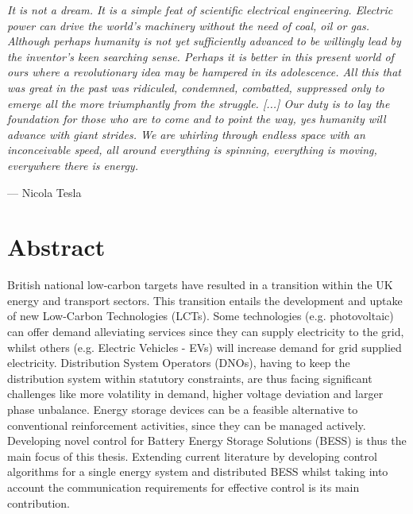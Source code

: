 
\epigraph{\textit{It is not a dream. It is a simple feat of scientific electrical engineering. Electric power can drive the world's machinery without the need of coal, oil or gas. Although perhaps humanity is not yet sufficiently advanced to be willingly lead by the inventor's keen searching sense. Perhaps it is better in this present world of ours where a revolutionary idea may be hampered in its adolescence. All this that was great in the past was ridiculed, condemned, combatted, suppressed only to emerge all the more triumphantly from the struggle. [...] Our duty is to lay the foundation for those who are to come and to point the way, yes humanity will advance with giant strides. We are whirling through endless space with an inconceivable speed, all around everything is spinning, everything is moving, everywhere there is energy.}}{--- Nicola Tesla}


\chapter*{Abstract}




British national low-carbon targets have resulted in a transition within the UK\linebreak
energy and transport sectors. This transition entails the development and uptake of\linebreak
new Low-Carbon Technologies (LCTs). Some technologies (e.g. photovoltaic) can\linebreak
offer demand alleviating services since they can supply electricity to the grid,\linebreak
whilst others (e.g. Electric Vehicles - EVs) will increase demand for grid supplied\linebreak
electricity. Distribution System Operators (DNOs), having to keep the distribution\linebreak
system within statutory constraints, are thus facing significant challenges like\linebreak
more volatility in demand, higher voltage deviation and larger phase unbalance.\linebreak
Energy storage devices can be a feasible alternative to conventional reinforcement\linebreak
activities, since they can be managed actively. Developing novel control for\linebreak
Battery Energy Storage Solutions (BESS) is thus the main focus of this thesis.\linebreak
Extending current literature by developing control algorithms for a single \linebreak
energy system and distributed BESS whilst taking into account the communication\linebreak
requirements for effective control is its main contribution.

